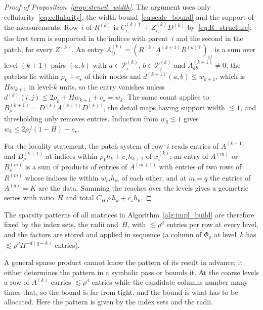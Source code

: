 \documentclass[hidelinks]{siamart}
\theoremstyle{nonumberplain}
\numberwithin{theorem}{section}
\begin{document}
\begin{proof}[Proof of Proposition~\textup{\ref{prop:stencil_width}}]
The argument uses only cellularity~\eqref{eq:cellularity}, the width
bound~\eqref{eq:scale_bound} and the support of the measurements.
Row~$i$ of $R^{(k)}$ is $C^{(k)\dagger}_{i,\cdot} + Z^{(k)}_{i,\cdot}
D^{(k)}$ by~\eqref{eq:R_structure}; the first term is supported in the
indices with parent~$i$ and the second in the patch, for every
$Z^{(k)}$.  An entry $A^{(k)}_{ij} = (R^{(k)} A^{(k+1)} R^{(k)\top})_{ij}$
is a sum over level-$(k{+}1)$ pairs $(a,b)$ with $a \in \mathcal{P}^{(k)}_i$,
$b \in \mathcal{P}^{(k)}_j$ and $A^{(k+1)}_{ab} \neq 0$; the patches lie
within $\rho_k + c_\star$ of their nodes and $d^{(k+1)}(a,b) \leq w_{k+1}$,
which is $H w_{k+1}$ in level-$k$ units, so the entry vanishes unless
$d^{(k)}(i,j) \leq 2 \rho_k + H w_{k+1} + c_\star = w_k$.  The same count
applies to $B^{(k+1)}_\rho = D^{(k)} A^{(k+1)} D^{(k)\top}$, the detail
maps having support width $\lesssim 1$, and thresholding only removes
entries.  Induction from $w_q \lesssim 1$ gives
$w_k \leq 2\rho/(1-H) + c_\star$.

For the locality statement, the patch system of row~$i$ reads entries
of $A^{(k+1)}$ and $B^{(k+1)}_\rho$ at indices within
$\rho_k h_k + c_\star h_{k+1}$ of $x^{(k)}_i$; an entry of $A^{(m)}$ or
$B^{(m)}_\rho$ is a sum of products of entries of $A^{(m+1)}$ with
entries of two rows of $R^{(m)}$ whose indices lie within $w_m h_m$ of
each other, and at $m = q$ the entries of $A^{(q)} = K$ are the data.
Summing the reaches over the levels gives a geometric series with
ratio~$H$ and total $C_H\, \rho\, h_k + c_\star h_k$.
\end{proof}

The sparsity patterns of all matrices in Algorithm~\ref{alg:impl_build}
are therefore fixed by the index sets, the radii and~$H$, with
$\lesssim \rho^d$ entries per row at every level, and the factors are
stored and applied in sequence (a column of $\Phi_\rho$ at level~$k$ has
$\lesssim \rho^d H^{-d(q-k)}$ entries).

A general sparse product cannot know the pattern of its result in
advance; it either determines the pattern in a symbolic pass or bounds
it.  At the coarse levels a row of $A^{(k)}$ carries $\lesssim \rho^d$
entries while the candidate columns number many times that, so the
bound is far from tight, and the bound is what has to be allocated.
Here the pattern is given by the index sets and the radii.
\end{document}
